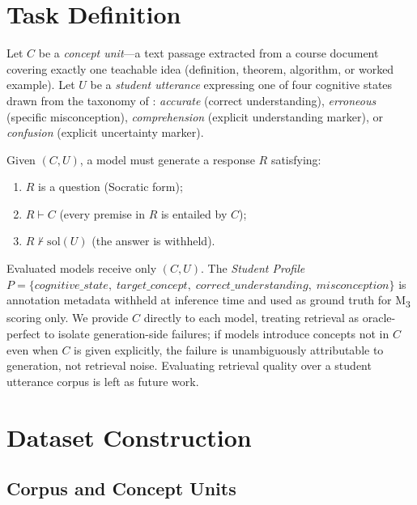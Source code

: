\documentclass[11pt]{article}
\newcommand{\mthree}{M\textsubscript{3}\xspace}
\begin{document}
\section{Task Definition}
\label{sec:task}

Let $C$ be a \textit{concept unit}---a text passage extracted from a course
document covering exactly one teachable idea (definition, theorem, algorithm,
or worked example).
Let $U$ be a \textit{student utterance} expressing one of four cognitive
states drawn from the taxonomy of \citet{liuy2025discerning}:
\textit{accurate} (correct understanding),
\textit{erroneous} (specific misconception),
\textit{comprehension} (explicit understanding marker), or
\textit{confusion} (explicit uncertainty marker).

Given $(C, U)$, a model must generate a response $R$ satisfying:

\begin{enumerate}[nosep]
  \item $R$ is a question (Socratic form);
  \item $R \vdash C$ \; (every premise in $R$ is entailed by $C$);
  \item $R \not\vdash \mathrm{sol}(U)$ \; (the answer is withheld).
\end{enumerate}

Evaluated models receive only $(C, U)$.
The \textit{Student Profile}
$P = \{\textit{cognitive\_state},\; \textit{target\_concept},\;
         \textit{correct\_understanding},\; \textit{misconception}\}$
is annotation metadata withheld at inference time and used as ground truth
for \mthree scoring only.
We provide $C$ directly to each model, treating retrieval as oracle-perfect
to isolate generation-side failures; if models introduce concepts not in $C$
even when $C$ is given explicitly, the failure is unambiguously attributable
to generation, not retrieval noise.
Evaluating retrieval quality over a student utterance corpus is left as
future work.

\section{Dataset Construction}
\label{sec:dataset}

\subsection{Corpus and Concept Units}
\end{document}
